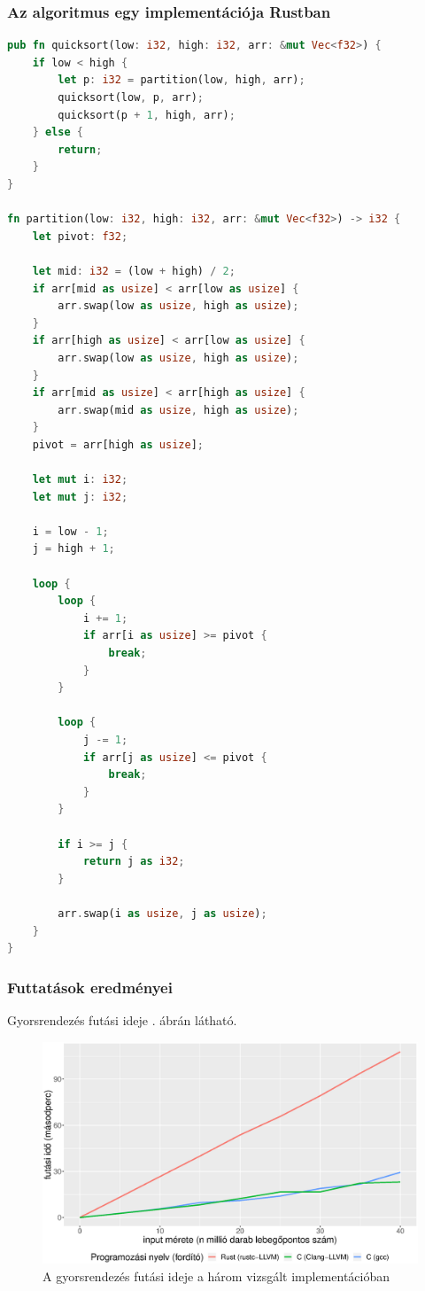 \subsubsection{Az algoritmus egy implementációja Rustban}

\begin{lstlisting}[language=Rust]
pub fn quicksort(low: i32, high: i32, arr: &mut Vec<f32>) {
    if low < high {
        let p: i32 = partition(low, high, arr);
        quicksort(low, p, arr);
        quicksort(p + 1, high, arr);
    } else {
        return;
    }
}

fn partition(low: i32, high: i32, arr: &mut Vec<f32>) -> i32 {
    let pivot: f32;

    let mid: i32 = (low + high) / 2;
    if arr[mid as usize] < arr[low as usize] {
        arr.swap(low as usize, high as usize);
    }
    if arr[high as usize] < arr[low as usize] {
        arr.swap(low as usize, high as usize);
    }
    if arr[mid as usize] < arr[high as usize] {
        arr.swap(mid as usize, high as usize);
    }
    pivot = arr[high as usize];

    let mut i: i32;
    let mut j: i32;

    i = low - 1;
    j = high + 1;

    loop {
        loop {
            i += 1;
            if arr[i as usize] >= pivot {
                break;
            }
        }

        loop {
            j -= 1;
            if arr[j as usize] <= pivot {
                break;
            }
        }

        if i >= j {
            return j as i32;
        }

        arr.swap(i as usize, j as usize);
    }
}

\end{lstlisting}

\subsubsection{Futtatások eredményei}

Gyorsrendezés futási ideje . ábrán látható.

\begin{figure}[h!]
\centering
\includegraphics[width=15.5cm]{kepek/quicksort_run.eps}
\caption{A gyorsrendezés futási ideje a három vizsgált implementációban}
\label{fig:quicksort}
\end{figure}

